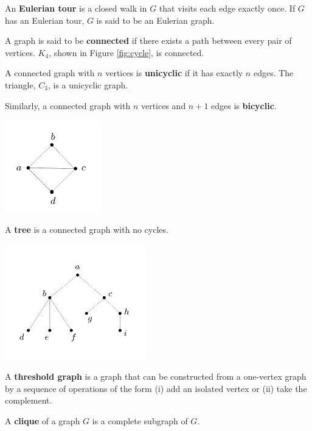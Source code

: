 \documentclass[11pt]{article}
\theoremstyle{definition}
\begin{document}
An \textbf{Eulerian tour} is a closed walk in $G$ that visits each edge exactly once. If $G$ has an Eulerian tour, $G$ is said to be an Eulerian graph.

A graph is said to be \textbf{connected} if there exists a path between every pair of vertices. $K_4$, shown in Figure \ref{fig:cycle}, is connected.

A connected graph with $n$ vertices is \textbf{unicyclic} if it has exactly $n$ edges. The triangle, $C_3$, is a unicyclic graph.  

Similarly, a connected graph with $n$ vertices and $n+1$ edges is \textbf{bicyclic}. 

\begin{center}
    \centering
    \includegraphics[width=\textwidth, height=4cm, keepaspectratio=true]{images/bicyclic.jpeg}
    \label{fig:bicyclic}
\end{center}

A \textbf{tree} is a connected graph with no cycles. 

\begin{center}
    \centering
    \includegraphics[width=\textwidth, height=5cm, keepaspectratio=true]{images/tree.jpeg}
    \label{fig:cycle}
\end{center}

A \textbf{threshold graph} is a graph that can be constructed from a one-vertex graph by a sequence of operations of the form (i) add an isolated vertex or (ii) take the complement.

A \textbf{clique} of a graph $G$ is a complete subgraph of $G$.
\end{document}

